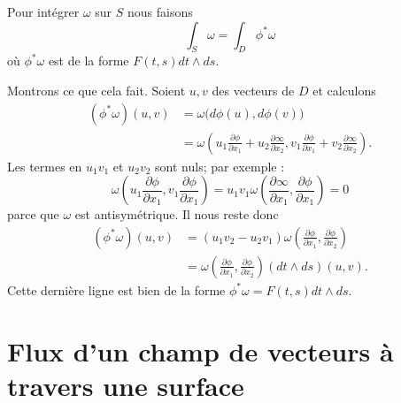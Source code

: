\begin{definition}
	Pour intégrer \( \omega\) sur \( S\) nous faisons
	\begin{equation}
		\int_S\omega=\int_D\phi^*\omega
	\end{equation}
	où \( \phi^*\omega\) est de la forme \( F(t,s)dt\wedge ds\).
\end{definition}
Montrons ce que cela fait. Soient \( u,v\) des vecteurs de \( D\) et calculons
\begin{subequations}
	\begin{align}
		(\phi^*\omega)(u,v) & =\omega\big( d\phi(u),d\phi(v) \big)                                                                                                                                                                    \\
		                    & =\omega\left(    u_1\frac{ \partial \phi }{ \partial x_1 }+u_2\frac{ \partial \infty }{ \partial x_2 },v_1\frac{ \partial \phi }{ \partial x_1 }+v_2\frac{ \partial \infty }{ \partial x_2 }   \right).
	\end{align}
\end{subequations}
Les termes en \( u_1v_1\) et \( u_2v_2\) sont nuls; par exemple :
\begin{equation}
	\omega\left( u_1\frac{ \partial \phi }{ \partial x_1 },v_1\frac{ \partial \phi }{ \partial x_1 } \right)=u_1v_1\omega\left( \frac{ \partial \infty }{ \partial x_1 },\frac{ \partial \phi }{ \partial x_1 } \right)=0
\end{equation}
parce que \( \omega\) est antisymétrique. Il nous reste donc
\begin{subequations}
	\begin{align}
		(\phi^*\omega)(u,v) & =(u_1v_2-u_2v_1)\omega\left( \frac{ \partial \phi }{ \partial x_1 },\frac{ \partial \phi }{ \partial x_2 } \right)     \\
		                    & =\omega\left( \frac{ \partial \phi }{ \partial x_1 },\frac{ \partial \phi }{ \partial x_2 } \right)(dt\wedge ds)(u,v).
	\end{align}
\end{subequations}
Cette dernière ligne est bien de la forme \( \phi^*\omega=F(t,s)dt\wedge ds\).

\section{Flux d'un champ de vecteurs à travers une surface}

